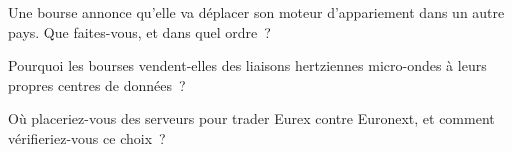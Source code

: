 \begin{interviewq}\label{iq:nw:the-european-map:4}
Une bourse annonce qu'elle va déplacer son moteur d'appariement dans un autre pays. Que faites-vous, et dans quel ordre~?
\end{interviewq}

\begin{interviewq}\label{iq:nw:the-european-map:5}
Pourquoi les bourses vendent-elles des liaisons hertziennes micro-ondes à leurs propres centres de données~?
\end{interviewq}

\begin{interviewq}\label{iq:nw:the-european-map:6}
Où placeriez-vous des serveurs pour trader Eurex contre Euronext, et comment vérifieriez-vous ce choix~?
\end{interviewq}
